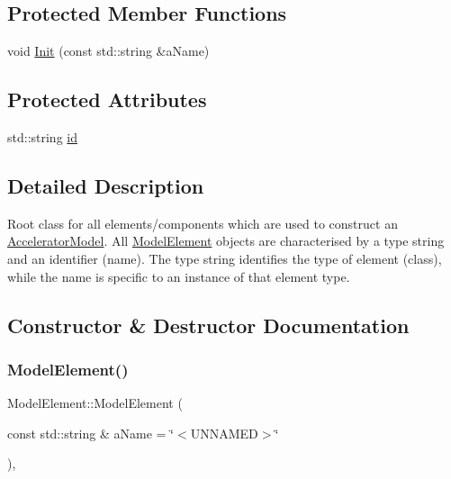 \subsection*{Protected Member Functions}
\begin{DoxyCompactItemize}
\item 
void \hyperlink{classModelElement_a1898eee7e930e5aff788e13fa4619529}{Init} (const std\+::string \&a\+Name)
\end{DoxyCompactItemize}
\subsection*{Protected Attributes}
\begin{DoxyCompactItemize}
\item 
std\+::string \hyperlink{classModelElement_aada171ead2085c75b592cf07d91bc5c2}{id}
\end{DoxyCompactItemize}


\subsection{Detailed Description}
Root class for all elements/components which are used to construct an \hyperlink{classAcceleratorModel}{Accelerator\+Model}. All \hyperlink{classModelElement}{Model\+Element} objects are characterised by a type string and an identifier (name). The type string identifies the type of element (class), while the name is specific to an instance of that element type. 

\subsection{Constructor \& Destructor Documentation}
\mbox{\label{classModelElement_ac9c52abd91d0352df179d0719b63e060}} 
\subsubsection{\texorpdfstring{Model\+Element()}{ModelElement()}}
{\footnotesize\ttfamily Model\+Element\+::\+Model\+Element (\begin{DoxyParamCaption}\item[{const std\+::string \&}]{a\+Name = {\ttfamily \char`\"{}$<$UNNAMED$>$\char`\"{}} }\end{DoxyParamCaption})\hspace{0.3cm}{\ttfamily [inline]}, {\ttfamily [explicit]}}

